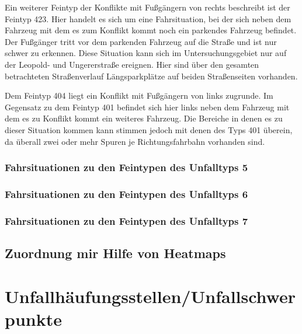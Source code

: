 Ein weiterer Feintyp der Konflikte mit Fußgängern von rechts beschreibt ist der Feintyp 423. Hier handelt es sich um eine Fahrsituation, bei der sich neben dem Fahrzeug mit dem es zum Konflikt kommt noch ein parkendes Fahrzeug befindet. Der Fußgänger tritt vor dem parkenden Fahrzeug auf die Straße und ist nur schwer zu erkennen. Diese Situation kann sich im Untersuchungsgebiet nur auf der Leopold- und Ungererstraße ereignen. Hier sind über den gesamten betrachteten Straßenverlauf Längsparkplätze auf beiden Straßenseiten vorhanden.

Dem Feintyp 404 liegt ein Konflikt mit Fußgängern von links zugrunde. Im Gegensatz zu dem Feintyp 401 befindet sich hier links neben dem Fahrzeug mit dem es zu Konflikt kommt ein weiteres Fahrzeug. Die Bereiche in denen es zu dieser Situation kommen kann stimmen jedoch mit denen des Typs 401 überein, da überall zwei oder mehr Spuren je Richtungsfahrbahn vorhanden sind. 

\subsubsection{Fahrsituationen zu den Feintypen des Unfalltyps 5}


\subsubsection{Fahrsituationen zu den Feintypen des Unfalltyps 6}


\subsubsection{Fahrsituationen zu den Feintypen des Unfalltyps 7}


\subsection{Zuordnung mir Hilfe von Heatmaps}\label{section:Heatmaps}


\section{Unfallhäufungsstellen/Unfallschwerpunkte}


